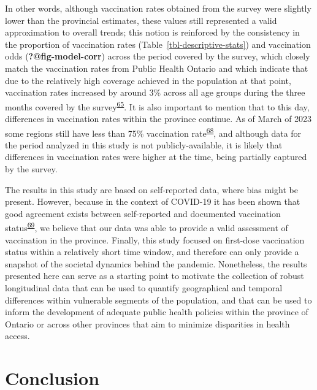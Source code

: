 \documentclass[
  letterpaper,
  DIV=11,
  numbers=noendperiod]{scrartcl}
\begin{document}
In other words, although vaccination rates obtained from the survey were
slightly lower than the provincial estimates, these values still
represented a valid approximation to overall trends; this notion is
reinforced by the consistency in the proportion of vaccination rates
(Table~\ref{tbl-descriptive-stats}) and vaccination odds
(\textbf{?@fig-model-corr}) across the period covered by the survey,
which closely match the vaccination rates from Public Health Ontario and
which indicate that due to the relatively high coverage achieved in the
population at that point, vaccination rates increased by around 3\%
across all age groups during the three months covered by the
survey\textsuperscript{\protect\hyperlink{ref-ontario-covid}{65}}. It is
also important to mention that to this day, differences in vaccination
rates within the province continue. As of March of 2023 some regions
still have less than 75\% vaccination
rate\textsuperscript{\protect\hyperlink{ref-ontario-covid-map}{68}}, and
although data for the period analyzed in this study is not
publicly-available, it is likely that differences in vaccination rates
were higher at the time, being partially captured by the survey.

The results in this study are based on self-reported data, where bias
might be present. However, because in the context of COVID-19 it has
been shown that good agreement exists between self-reported and
documented vaccination
status\textsuperscript{\protect\hyperlink{ref-stephenson2022}{69}}, we
believe that our data was able to provide a valid assessment of
vaccination in the province. Finally, this study focused on first-dose
vaccination status within a relatively short time window, and therefore
can only provide a snapshot of the societal dynamics behind the
pandemic. Nonetheless, the results presented here can serve as a
starting point to motivate the collection of robust longitudinal data
that can be used to quantify geographical and temporal differences
within vulnerable segments of the population, and that can be used to
inform the development of adequate public health policies within the
province of Ontario or across other provinces that aim to minimize
disparities in health access.

\hypertarget{conclusion}{%
\section{Conclusion}\label{conclusion}}
\end{document}
